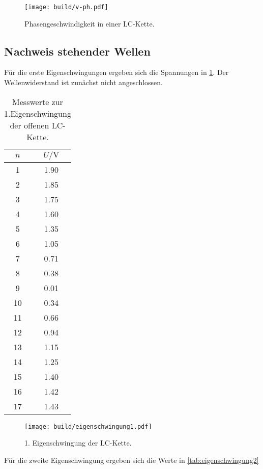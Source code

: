 \begin{figure}
  \centering
  \texttt{[image: build/v-ph.pdf]}
\caption{Phasengeschwindigkeit in einer LC-Kette.}
  \label{fig:v-ph}
\end{figure}

\subsection{Nachweis stehender Wellen}

Für die erste Eigenschwingungen ergeben sich die Spannungen in \ref{tab:eigenschwingung1}. Der Wellenwiderstand ist zunächst nicht angeschlossen.
\begin{table}
  \centering
  \caption{Messwerte zur 1.Eigenschwingung der offenen LC-Kette.}
  \label{tab:eigenschwingung1}
  \begin{tabular}{c c}
    \toprule
    $n$ & $U / \si{\volt}$ \\
\midrule
1 & 1.90 \\
2 & 1.85 \\
3 & 1.75 \\
4 & 1.60 \\
5 & 1.35 \\
6 & 1.05 \\
7 & 0.71 \\
8 & 0.38 \\
9 & 0.01 \\
10 & 0.34 \\
11 & 0.66 \\
12 & 0.94 \\
13 & 1.15 \\
14 & 1.25 \\
15 & 1.40 \\
16 & 1.42 \\
17 & 1.43 \\
\bottomrule
\end{tabular}
\end{table}

\begin{figure}
  \centering
  \texttt{[image: build/eigenschwingung1.pdf]}
\caption{1. Eigenschwingung der LC-Kette.}
  \label{fig:eigenschwingung1}
\end{figure}

Für die zweite Eigenschwingung ergeben sich die Werte in \ref{tab:eigenschwingung2}

